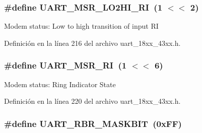 \subsubsection[{\texorpdfstring{U\+A\+R\+T\+\_\+\+M\+S\+R\+\_\+\+L\+O2\+H\+I\+\_\+\+RI}{UART_MSR_LO2HI_RI}}]{\setlength{\rightskip}{0pt plus 5cm}\#define U\+A\+R\+T\+\_\+\+M\+S\+R\+\_\+\+L\+O2\+H\+I\+\_\+\+RI~(1 $<$$<$ 2)}\hypertarget{group___u_a_r_t__18_x_x__43_x_x_ga5b2defd6ffec805753fbf799838984ed}{}\label{group___u_a_r_t__18_x_x__43_x_x_ga5b2defd6ffec805753fbf799838984ed}
Modem status\+: Low to high transition of input RI 

Definición en la línea 216 del archivo uart\+\_\+18xx\+\_\+43xx.\+h.

\subsubsection[{\texorpdfstring{U\+A\+R\+T\+\_\+\+M\+S\+R\+\_\+\+RI}{UART_MSR_RI}}]{\setlength{\rightskip}{0pt plus 5cm}\#define U\+A\+R\+T\+\_\+\+M\+S\+R\+\_\+\+RI~(1 $<$$<$ 6)}\hypertarget{group___u_a_r_t__18_x_x__43_x_x_ga1f4efd8727007b41de36b8b6ab9d4f6b}{}\label{group___u_a_r_t__18_x_x__43_x_x_ga1f4efd8727007b41de36b8b6ab9d4f6b}
Modem status\+: Ring Indicator State 

Definición en la línea 220 del archivo uart\+\_\+18xx\+\_\+43xx.\+h.

\subsubsection[{\texorpdfstring{U\+A\+R\+T\+\_\+\+R\+B\+R\+\_\+\+M\+A\+S\+K\+B\+IT}{UART_RBR_MASKBIT}}]{\setlength{\rightskip}{0pt plus 5cm}\#define U\+A\+R\+T\+\_\+\+R\+B\+R\+\_\+\+M\+A\+S\+K\+B\+IT~(0x\+F\+F)}\hypertarget{group___u_a_r_t__18_x_x__43_x_x_ga06774e65c2ca095c4373122ed9a390b8}{}\label{group___u_a_r_t__18_x_x__43_x_x_ga06774e65c2ca095c4373122ed9a390b8}


